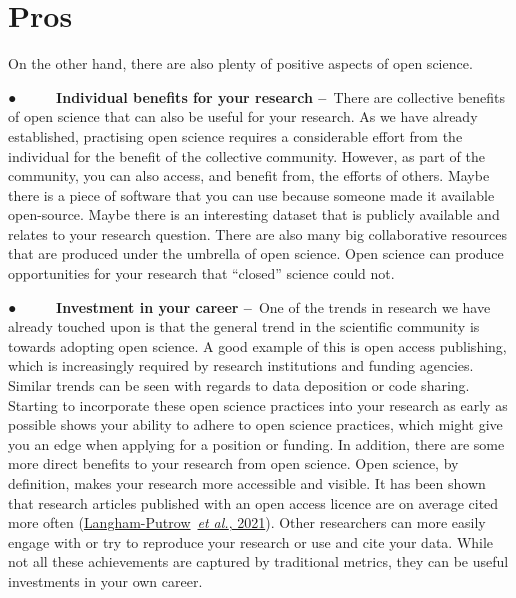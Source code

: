 \documentclass[
]{book}
\begin{document}
\hypertarget{pros}{%
\section{\texorpdfstring{\textbf{Pros}}{Pros}}\label{pros}}

On the other hand, there are also plenty of positive aspects of open science.

● ~ ~ ~ \textbf{Individual benefits for your research --}~There are collective benefits of open science that can also be useful for your research. As we have already established, practising open science requires a considerable effort from the individual for the benefit of the collective community. However, as part of the community, you can also access, and benefit from, the efforts of others. Maybe there is a piece of software that you can use because someone made it available open-source. Maybe there is an interesting dataset that is publicly available and relates to your research question. There are also many big collaborative resources that are produced under the umbrella of open science. Open science can produce opportunities for your research that ``closed'' science could not.

● ~ ~ ~ \textbf{Investment in your career --}~One of the trends in research we have already touched upon is that the general trend in the scientific community is towards adopting open science. A good example of this is open access publishing, which is increasingly required by research institutions and funding agencies. Similar trends can be seen with regards to data deposition or code sharing. Starting to incorporate these open science practices into your research as early as possible shows your ability to adhere to open science practices, which might give you an edge when applying for a position or funding. In addition, there are some more direct benefits to your research from open science. Open science, by definition, makes your research more accessible and visible. It has been shown that research articles published with an open access licence are on average cited more often (\href{https://journals.plos.org/plosone/article?id=10.1371/journal.pone.0253129}{Langham-Putrow}~\href{https://journals.plos.org/plosone/article?id=10.1371/journal.pone.0253129}{\emph{et al.}}\href{https://journals.plos.org/plosone/article?id=10.1371/journal.pone.0253129}{, 2021}). Other researchers can more easily engage with or try to reproduce your research or use and cite your data. While not all these achievements are captured by traditional metrics, they can be useful investments in your own career.
\end{document}
